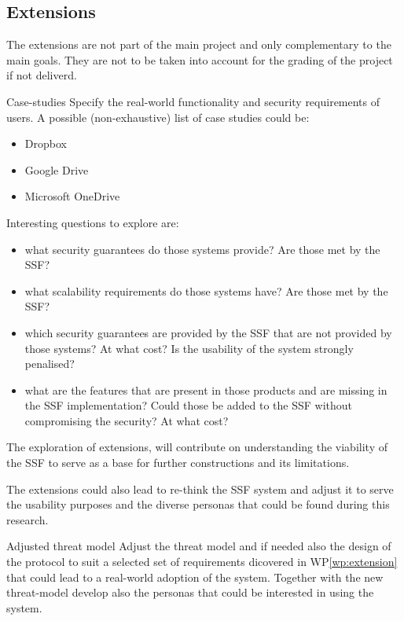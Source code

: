 \documentclass[E]{BAMASA}
\begin{document}
\subsection{Extensions}
The extensions are not part of the main project and only complementary to the main goals.
They are not to be taken into account for the grading of the project if not deliverd. 

\begin{workpackage}{Case-studies}\label{wp:extension}
	Specify the real-world functionality and security requirements of users.
    A possible (non-exhaustive) list of case studies could be:
    \begin{itemize}
        \item Dropbox
        \item Google Drive
        \item Microsoft OneDrive
    \end{itemize}
    Interesting questions to explore are:
    \begin{itemize}
        \item what security guarantees do those systems provide? Are those met by the SSF?
        \item what scalability requirements do those systems have? Are those met by the SSF?
        \item which security guarantees are provided by the SSF that are not provided 
                by those systems? At what cost? Is the usability of the system strongly penalised?
        \item what are the features that are present in those products and are missing in the SSF
                implementation? Could those be added to the SSF without compromising the security? 
                At what cost?
    \end{itemize}
    
    The exploration of extensions, will contribute on understanding 
    the viability of the SSF to serve as a base for further constructions
    and its limitations.

    The extensions could also lead to re-think the SSF system and adjust it to
    serve the usability purposes and the diverse personas that could be found during
    this research.
\end{workpackage}

\begin{workpackage}{Adjusted threat model}\label{wp:adjusted-thread-model}
    Adjust the threat model and if needed also the design of the protocol to suit 
    a selected set of requirements dicovered in WP\ref{wp:extension} that could lead
    to a real-world adoption of the system. Together with the new threat-model 
    develop also the personas that could be interested in using the system.  
\end{workpackage}
\end{document}
